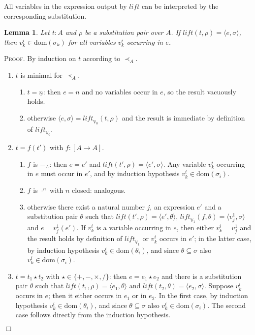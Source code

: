 \documentclass{article}
\newtheorem{lemma}[definition]{Lemma}
\newenvironment{proof}{\smallskip\textsc{Proof.}}{\hspace*{\fill}$\Box$}
\newcommand{\V}{{\mathbb V}}
\newcommand{\less}{\mathrel{\prec_A}}
\newcommand{\liftv}[1]{\ensuremath{\mathit{lift}_{\V_{#1}}}}
\newcommand{\lift}{\ensuremath{\mathit{lift}}}
\newcommand{\dom}{\ensuremath{\mathrm{dom}}}
\begin{document}
All variables in the expression output by $\lift$ can be interpreted by
the corresponding substitution.

\begin{lemma}\label{liftdom}
Let $t:A$ and $\rho$ be a substitution pair over $A$.
If $\lift(t,\rho)=\langle e,\sigma\rangle$, then $v^i_k\in\dom(\sigma_k)$
for all variables $v^i_k$ occurring in $e$.
\end{lemma}
\begin{proof}
By induction on $t$ according to $\less$.
\begin{enumerate}
\item $t$ is minimal for $\less$.
\begin{enumerate}
\item $t=\underline n$: then $e=n$ and no variables occur in $e$, so the
result vacuously holds.
\item otherwise $\langle e,\sigma\rangle=\liftv0(t,\rho)$ and the result
is immediate by definition of $\liftv0$.
\end{enumerate}
\item $t=f(t')$ with $f:[A\to A]$.
\begin{enumerate}
\item $f$ is $-_A$: then $e=e'$ and $\lift(t',\rho)=\langle e',\sigma\rangle$.
Any variable $v^i_k$ occurring in $e$ must occur in $e'$, and by
induction hypothesis $v^i_k\in\dom(\sigma_i)$.
\item $f$ is $\cdot^n$ with $n$ closed: analogous.
\item otherwise there exist a natural number $j$, an expression $e'$
and a substitution pair $\theta$ such that
$\lift(t',\rho)=\langle e',\theta\rangle$,
$\liftv1(f,\theta)=\langle v^1_j,\sigma\rangle$ and $e=v^1_j(e')$.
If $v^i_k$ is a variable occurring in $e$, then either $v^i_k=v^1_j$ and
the result holds by definition of $\liftv1$ or $v^i_k$ occurs in $e'$;
in the latter case, by induction hypothesis $v^i_k\in\dom(\theta_i)$, and
since $\theta\subseteq\sigma$ also $v^i_k\in\dom(\sigma_i)$.
\end{enumerate}
\item $t=t_1\star t_2$ with $\star\in\{+,-,\times,/\}$: then
$e=e_1\star e_2$ and there is a substitution pair $\theta$ such that
$\lift(t_1,\rho)=\langle e_1,\theta\rangle$ and
$\lift(t_2,\theta)=\langle e_2,\sigma\rangle$.  Suppose $v^i_k$ occurs
in $e$; then it either occurs in $e_1$ or in $e_2$.  In the first
case, by induction hypothesis $v^i_k\in\dom(\theta_i)$, and since
$\theta\subseteq\sigma$ also $v^i_k\in\dom(\sigma_i)$.  The second
case follows directly from the induction hypothesis.
\end{enumerate}
\end{proof}
\end{document}
